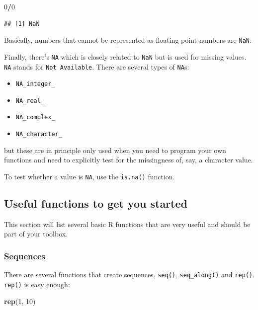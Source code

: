 \documentclass[]{gitbook}
\newenvironment{Shaded}{\begin{snugshade}}{\end{snugshade}}
\newcommand{\DecValTok}[1]{\textcolor[rgb]{0.00,0.00,0.81}{#1}}
\newcommand{\KeywordTok}[1]{\textcolor[rgb]{0.13,0.29,0.53}{\textbf{#1}}}
\newcommand{\NormalTok}[1]{#1}
\newcommand{\OperatorTok}[1]{\textcolor[rgb]{0.81,0.36,0.00}{\textbf{#1}}}
\providecommand{\tightlist}{%
  \setlength{\itemsep}{0pt}\setlength{\parskip}{0pt}}
\begin{document}
\begin{Shaded}
\begin{Highlighting}[]
\DecValTok{0}\OperatorTok{/}\DecValTok{0}
\end{Highlighting}
\end{Shaded}

\begin{verbatim}
## [1] NaN
\end{verbatim}

Basically, numbers that cannot be represented as floating point numbers are \texttt{NaN}.

Finally, there's \texttt{NA} which is closely related to \texttt{NaN} but is used for missing values. \texttt{NA} stands for \texttt{Not\ Available}. There are
several types of \texttt{NA}s:

\begin{itemize}
\tightlist
\item
  \texttt{NA\_integer\_}
\item
  \texttt{NA\_real\_}
\item
  \texttt{NA\_complex\_}
\item
  \texttt{NA\_character\_}
\end{itemize}

but these are in principle only used when you need to program your own functions and need to explicitly test for the missingness of, say,
a character value.

To test whether a value is \texttt{NA}, use the \texttt{is.na()} function.

\hypertarget{useful-functions-to-get-you-started}{%
\subsection{Useful functions to get you started}\label{useful-functions-to-get-you-started}}

This section will list several basic R functions that are very useful and should be part of your toolbox.

\hypertarget{sequences}{%
\subsubsection{Sequences}\label{sequences}}

There are several functions that create sequences, \texttt{seq()}, \texttt{seq\_along()} and \texttt{rep()}. \texttt{rep()} is easy enough:

\begin{Shaded}
\begin{Highlighting}[]
\KeywordTok{rep}\NormalTok{(}\DecValTok{1}\NormalTok{, }\DecValTok{10}\NormalTok{)}
\end{Highlighting}
\end{Shaded}
\end{document}
